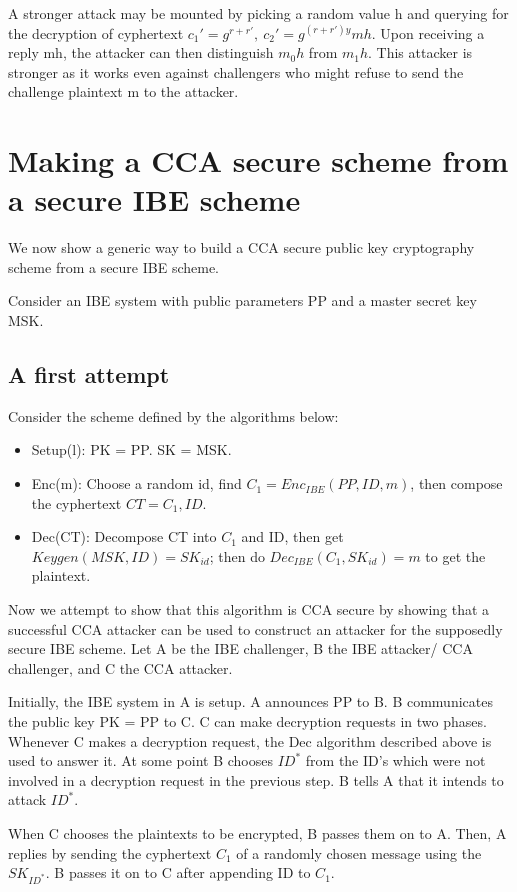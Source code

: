\documentclass[11pt]{article}
\begin{document}
A stronger attack may be mounted by picking a random value h and querying for the decryption of cyphertext $c_{1}' = g^{r + r'},\ c_{2}' = g^{(r+r')y}mh$. Upon receiving a reply mh, the attacker can then distinguish $m_{0}h$ from $m_{1}h$. This attacker is stronger as it works even against challengers who might refuse to send the challenge plaintext m to the attacker.

\section{Making a CCA secure scheme from a secure IBE scheme}
We now show a generic way to build a CCA secure public key cryptography scheme from a secure IBE scheme.

Consider an IBE system with public parameters PP and a master secret key MSK.

\subsection{A first attempt}
Consider the scheme defined by the algorithms below:

\begin{itemize}
 \item Setup(l): PK = PP. SK = MSK.
 \item Enc(m): Choose a random id, find $C_{1} = Enc_{IBE}(PP,ID,m)$, then compose the cyphertext $CT = C_{1}, ID$.
 \item Dec(CT): Decompose CT into $C_{1}$ and ID, then get $Keygen(MSK, ID) = SK_{id}$; then do $Dec_{IBE}(C_{1}, SK_{id}) = m$ to get the plaintext.
\end{itemize}

Now we attempt to show that this algorithm is CCA secure by showing that a successful CCA attacker can be used to construct an attacker for the supposedly secure IBE scheme. Let A be the IBE challenger, B the IBE attacker/ CCA challenger, and C the CCA attacker.

Initially, the IBE system in A is setup. A announces PP to B. B communicates the public key PK = PP to C. C can make decryption requests in two phases. Whenever C makes a decryption request, the Dec algorithm described above is used to answer it. At some point B chooses $ID^{*}$ from the ID's which were not involved in a decryption request in the previous step. B tells A that it intends to attack $ID^{*}$.

When C chooses the plaintexts to be encrypted, B passes them on to A. Then, A replies by sending the cyphertext $C_{1}$ of a randomly chosen message using the $SK_{ID^{*}}$. B passes it on to C after appending ID to $C_{1}$.
\end{document}
